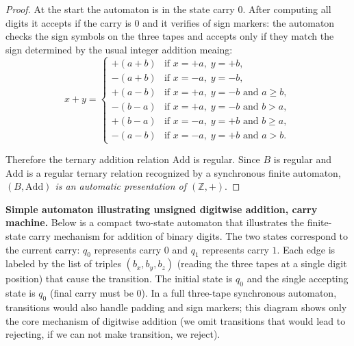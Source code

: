 \documentclass{pracalicmgr2025}
\theoremstyle{plain}            %
\theoremstyle{remark}           %
\theoremstyle{definition}       %
\begin{document}
\begin{proof}
At the start the automaton is in the state carry $0$. After computing all digits it accepts if the carry is  $0$ and it verifies of sign markers: the automaton checks the sign symbols on the three tapes and accepts only if they match the sign determined by the usual integer addition meaing:$$x+y =
\begin{cases}
  +(a+b) & \text{if } x=+a,\; y=+b, \\[3pt]
  -(a+b) & \text{if } x=-a,\; y=-b, \\[3pt]
  +(a-b) & \text{if } x=+a,\; y=-b \text{ and } a \ge b, \\[3pt]
  -(b-a) & \text{if } x=+a,\; y=-b \text{ and } b > a, \\[3pt]
  +(b-a) & \text{if } x=-a,\; y=+b \text{ and } b \ge a, \\[3pt]
  -(a-b) & \text{if } x=-a,\; y=+b \text{ and } a > b.
\end{cases}$$
 
Therefore the ternary addition relation $\mathrm{Add}$ is regular. Since $B$ is regular and $\mathrm{Add}$ is a regular ternary relation recognized by a synchronous finite automaton, \emph{$(B,\mathrm{Add})$ is an automatic presentation of $(\mathbb{Z},+)$}.
\end{proof}


\noindent\textbf{Simple automaton illustrating unsigned digitwise addition, carry machine.}
Below is a compact two-state automaton that illustrates the finite-state carry mechanism for addition of binary digits. The two states correspond to the current carry: $q_0$ represents carry $0$ and $q_1$ represents carry $1$. Each edge is labeled by the list of triples $(b_x,b_y,b_z)$ (reading the three tapes at a single digit position) that cause the transition. The initial state is $q_0$ and the single accepting state is $q_0$ (final carry must be $0$). In a full three-tape synchronous automaton, transitions would also handle padding and sign markers; this diagram shows only the core mechanism of digitwise addition (we omit transitions that would lead to rejecting, if we can not make transition, we reject).

\begin{center}
\end{center}
\end{document}
